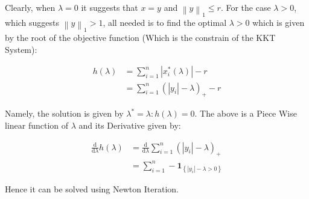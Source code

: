 \documentclass[]{article}
\newcommand{\MyParen}[1]{\left( #1 \right)}
\newcommand{\MyNorm}[2]{{\left\| #1 \right\|}_{#2}}
\begin{document}
	Clearly, when $ \lambda = 0 $ it suggests that $ x = y $ and $ \MyNorm{y}{1} \leq r $. For the case $ \lambda > 0 $, which suggests $ \MyNorm{y}{1} > 1 $, all needed is to find the optimal $ \lambda > 0 $ which is given by the root of the objective function (Which is the constrain of the KKT System):
	
	\begin{align*}
	h \left( \lambda \right) & = \sum_{i = 1}^{n} \left| {x}_{i}^{\ast} \left( \lambda \right) \right| - r \\
	& = \sum_{i = 1}^{n} { \left( \left| {y}_{i} \right| - \lambda \right) }_{+} - r
	\end{align*}
	
	Namely, the solution is given by $ {\lambda}^{\ast} = \lambda : h \MyParen{\lambda} = 0 $. The above is a Piece Wise linear function of $ \lambda $ and its Derivative given by:
	
	\begin{align*}
	\frac{\mathrm{d} }{\mathrm{d} \lambda} h \left( \lambda \right) & = \frac{\mathrm{d} }{\mathrm{d} \lambda} \sum_{i = 1}^{n} { \left( \left| {y}_{i} \right| - \lambda \right) }_{+} \\
	& = \sum_{i = 1}^{n} -{ \mathbf{1} }_{\left\{ \left| {y}_{i} \right| - \lambda > 0 \right\}}
	\end{align*}
	
	Hence it can be solved using Newton Iteration.
	
\end{document}
